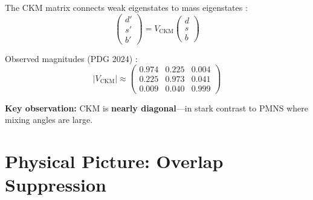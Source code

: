 \medskip
The CKM matrix connects weak eigenstates to mass eigenstates \tagBL{}:
\begin{equation}
    \begin{pmatrix} d' \\ s' \\ b' \end{pmatrix}
    = V_{\text{CKM}}
    \begin{pmatrix} d \\ s \\ b \end{pmatrix}
\end{equation}

Observed magnitudes (PDG 2024) \tagBL{}:
\begin{equation}
    |V_{\text{CKM}}| \approx
    \begin{pmatrix}
        0.974 & 0.225 & 0.004 \\
        0.225 & 0.973 & 0.041 \\
        0.009 & 0.040 & 0.999
    \end{pmatrix}
\end{equation}

\textbf{Key observation:} CKM is \textbf{nearly diagonal}---in stark contrast to
PMNS where mixing angles are large.

\section{Physical Picture: Overlap Suppression}
\label{sec:ckm_physical}

